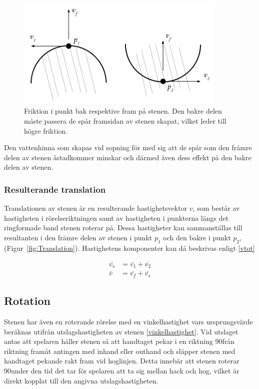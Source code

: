 \documentclass[11pt]{article} %
\begin{document}
\begin{figure}[ht!]
\centering
\includegraphics[width=100mm]{Friktion_bakfram.png}
\caption{Friktion i punkt bak respektive fram på stenen. Den bakre delen måste passera de spår framsidan av stenen skapat, vilket leder till högre friktion.}
\label{fig:Friktion}
\label{overflow}
\end{figure}

Den vattenhinna som skapas vid sopning för med sig att de spår som den främre delen av stenen åstadkommer minskar och därmed  även dess effekt på den bakre delen av stenen. 

\subsubsection{Resulterande translation}

Translationen av stenen är en resulterande hastighetsvektor $v$, som består av hastigheten i rörelseriktningen samt av hastigheten i punkterna längs det ringformade band stenen roterar på. Dessa hastigheter kan sammanställas till resultanten i den främre delen av stenen i punkt $p_1$ och den bakre i punkt $p_2$, (Figur~\ref{fig:Translation}). Hastighetens komponenter kan då beskrivas enligt \eqref{vtot}

 \begin{subequations}\label{vtot}
 \begin{align}
 \bar{v_s}& = \bar{v_1}+\bar{v_2}\\
 \bar{v}&=\bar{v_f}+\bar{v_s}
 \end{align}
 \end{subequations}

\subsection{Rotation}


Stenen har även en roterande rörelse med en vinkelhastighet vars ursprungsvärde beräknas utifrån utslagshastigheten av stenen \eqref{vinkelhastighet}.
Vid utslaget antas att spelaren håller stenen så att handtaget pekar i en riktning 90\textdegree  från riktning framåt antingen med inhand eller outhand och släpper stenen med handtaget pekande rakt fram vid hoglinjen. Detta innebär att stenen roterar 90\textdegree under den tid det tar för spelaren att ta sig mellan hack och hog, vilket är direkt kopplat till den angivna utslagshastigheten. 
\end{document}

